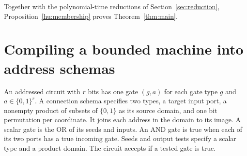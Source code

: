 \documentclass[11pt]{article}
\theoremstyle{definition}
\theoremstyle{remark}
\numberwithin{equation}{section}
\begin{document}
Together with the polynomial-time reductions of Section~\ref{sec:reduction},
Proposition~\ref{hu:membership} proves Theorem~\ref{thm:main}.

\appendix

\section{Compiling a bounded machine into address schemas}
\label{app:compiler}
An addressed circuit with $r$ bits has one gate $(g,a)$ for each
gate type $g$ and $a\in\{0,1\}^r$. A connection schema specifies
two types, a target input port, a nonempty product of subsets of
$\{0,1\}$ as its source domain, and one bit permutation per coordinate.
It joins each address in the domain to its image. A scalar gate is
the OR of its seeds and inputs. An AND gate is true when each of its two
ports has a true incoming gate. Seeds and output tests specify a scalar
type and a product domain. The circuit accepts if a tested gate is true.
\end{document}
